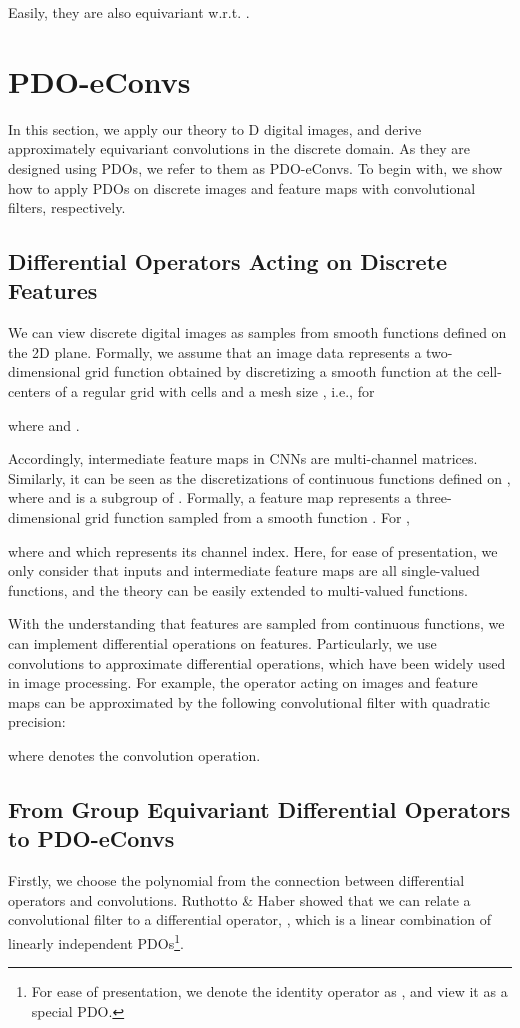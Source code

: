 \documentclass{article}
\begin{document}
Easily, they are also equivariant w.r.t. .

\section{PDO-eConvs \label{section4}}
In this section, we apply our theory to D digital images, and derive approximately equivariant convolutions in the discrete domain. As they are designed using PDOs, we refer to them as PDO-eConvs. To begin with, we show how to apply PDOs on discrete images and feature maps with convolutional filters, respectively.

\subsection{Differential Operators Acting on Discrete Features}

We can view discrete digital images as samples from smooth functions defined on the 2D plane. Formally, we assume that an image data  represents a two-dimensional grid function obtained by discretizing a smooth function  at the cell-centers of a regular grid with  cells and a mesh size , i.e., for 

where  and . 

Accordingly, intermediate feature maps in CNNs are multi-channel matrices. Similarly, 
it can be seen as the  discretizations of continuous functions defined on , where  and  is a subgroup of . Formally, a feature map  represents a three-dimensional grid function sampled from a smooth function .
For ,

where  and  which represents its channel index. Here, for ease of presentation, we only consider that inputs and intermediate feature maps are all single-valued functions, and the theory can be easily extended to multi-valued functions.

With the understanding that features are sampled from continuous functions, we can implement differential operations on features. Particularly, we use convolutions to approximate differential operations, which have been widely used in image processing. For example, the operator acting on images and feature maps can be approximated by the following  convolutional filter with quadratic precision:

where  denotes the convolution operation.

\subsection{From Group Equivariant Differential Operators to PDO-eConvs}
Firstly, we choose the polynomial  from the connection between differential operators and convolutions. Ruthotto \& Haber  showed that we can relate a  convolutional filter to a differential operator, , which is a linear combination of  linearly independent PDOs\footnote{For ease of presentation, we denote the identity operator as , and view it as a  special PDO.}.
\end{document}
